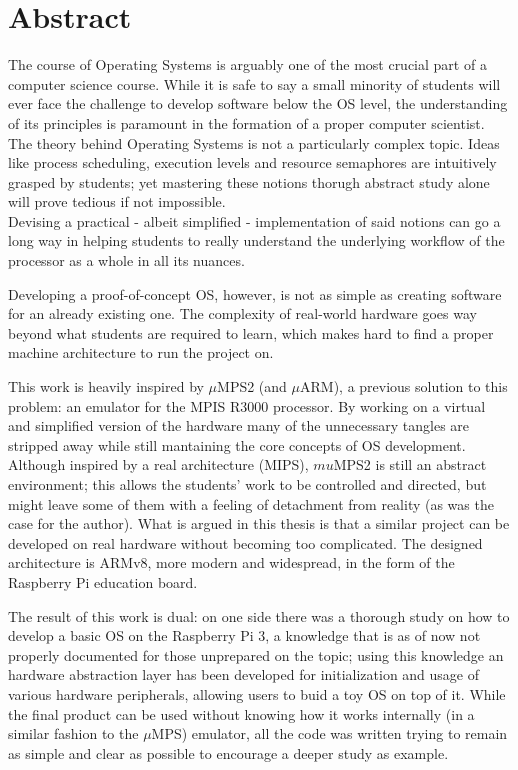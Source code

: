 \documentclass[12pt,a4paper,openright,twoside]{report}
\begin{document}
\chapter*{Abstract}                 %
The course of Operating Systems is arguably one of the most crucial part of 
a computer science course. While it is safe to say a small minority of students
will ever face the challenge to develop software below the OS level, the 
understanding of its principles is paramount in the formation of a proper computer
scientist.
The theory behind Operating Systems is not a particularly complex topic. Ideas 
like process scheduling, execution levels and resource semaphores are intuitively
grasped by students; yet mastering these notions thorugh abstract study alone
will prove tedious if not impossible.\\
Devising a practical - albeit simplified - implementation of said notions can
go a long way in helping students to really understand the underlying workflow
of the processor as a whole in all its nuances. 

Developing a proof-of-concept OS, however, is not as simple as creating software for
an already existing one. The complexity of real-world hardware
 goes way beyond what students are required to learn, which makes hard to
 find a proper machine architecture to run the project on.

This work is heavily inspired by $\mu$MPS2 (and $\mu$ARM), a previous solution to this problem:
 an emulator for the MPIS R3000 processor. By working on a virtual and simplified
 version of the hardware many of the unnecessary tangles are stripped away while
 still mantaining the core concepts of OS development.
Although inspired by a real architecture (MIPS), $mu$MPS2 is still an abstract 
environment; this allows the students' work to be controlled and directed,
 but might leave some of them with a feeling of detachment from reality
 (as was the case for the author).
What is argued in this thesis is that a similar project can be developed
on real hardware without becoming too complicated. The designed architecture
is ARMv8, more modern and widespread, in the form of the Raspberry Pi education
board.

The result of this work is dual: on one side there was a thorough study on
how to develop a basic OS on the Raspberry Pi 3, a knowledge that is
as of now not properly documented for those unprepared on the topic; using
this knowledge an hardware abstraction layer has been developed for 
initialization and usage of various hardware peripherals, allowing users
to buid a toy OS on top of it.
While the final product can be used without knowing how it works internally 
(in a similar fashion to the $\mu$MPS) emulator, all the code was written 
trying to remain as simple and clear as possible to encourage a deeper study
as example.
\end{document}
